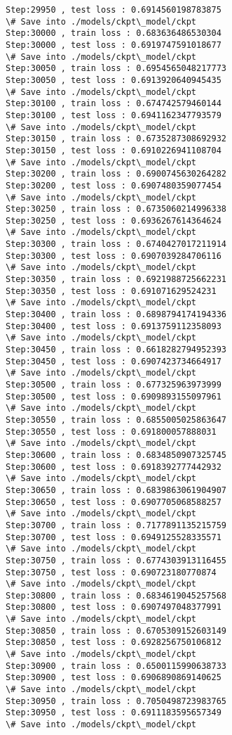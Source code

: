 \documentclass[11pt]{article}
\begin{document}
\begin{Verbatim}[commandchars=\\\{\}]
Step:29950 , test loss : 0.6914560198783875
\# Save into ./models/ckpt\_model/ckpt
Step:30000 , train loss : 0.683636486530304
Step:30000 , test loss : 0.6919747591018677
\# Save into ./models/ckpt\_model/ckpt
Step:30050 , train loss : 0.6954565048217773
Step:30050 , test loss : 0.6913920640945435
\# Save into ./models/ckpt\_model/ckpt
Step:30100 , train loss : 0.674742579460144
Step:30100 , test loss : 0.6941162347793579
\# Save into ./models/ckpt\_model/ckpt
Step:30150 , train loss : 0.6735287308692932
Step:30150 , test loss : 0.6910226941108704
\# Save into ./models/ckpt\_model/ckpt
Step:30200 , train loss : 0.6900745630264282
Step:30200 , test loss : 0.6907480359077454
\# Save into ./models/ckpt\_model/ckpt
Step:30250 , train loss : 0.6735060214996338
Step:30250 , test loss : 0.6936267614364624
\# Save into ./models/ckpt\_model/ckpt
Step:30300 , train loss : 0.6740427017211914
Step:30300 , test loss : 0.6907039284706116
\# Save into ./models/ckpt\_model/ckpt
Step:30350 , train loss : 0.6921988725662231
Step:30350 , test loss : 0.691071629524231
\# Save into ./models/ckpt\_model/ckpt
Step:30400 , train loss : 0.6898794174194336
Step:30400 , test loss : 0.6913759112358093
\# Save into ./models/ckpt\_model/ckpt
Step:30450 , train loss : 0.6618282794952393
Step:30450 , test loss : 0.6907423734664917
\# Save into ./models/ckpt\_model/ckpt
Step:30500 , train loss : 0.677325963973999
Step:30500 , test loss : 0.6909893155097961
\# Save into ./models/ckpt\_model/ckpt
Step:30550 , train loss : 0.6855005025863647
Step:30550 , test loss : 0.691800057888031
\# Save into ./models/ckpt\_model/ckpt
Step:30600 , train loss : 0.6834850907325745
Step:30600 , test loss : 0.6918392777442932
\# Save into ./models/ckpt\_model/ckpt
Step:30650 , train loss : 0.6839863061904907
Step:30650 , test loss : 0.6907705068588257
\# Save into ./models/ckpt\_model/ckpt
Step:30700 , train loss : 0.7177891135215759
Step:30700 , test loss : 0.6949125528335571
\# Save into ./models/ckpt\_model/ckpt
Step:30750 , train loss : 0.6774303913116455
Step:30750 , test loss : 0.690723180770874
\# Save into ./models/ckpt\_model/ckpt
Step:30800 , train loss : 0.6834619045257568
Step:30800 , test loss : 0.6907497048377991
\# Save into ./models/ckpt\_model/ckpt
Step:30850 , train loss : 0.6705309152603149
Step:30850 , test loss : 0.6928256750106812
\# Save into ./models/ckpt\_model/ckpt
Step:30900 , train loss : 0.6500115990638733
Step:30900 , test loss : 0.6906890869140625
\# Save into ./models/ckpt\_model/ckpt
Step:30950 , train loss : 0.7050498723983765
Step:30950 , test loss : 0.6911183595657349
\# Save into ./models/ckpt\_model/ckpt

\end{Verbatim}
\end{document}
